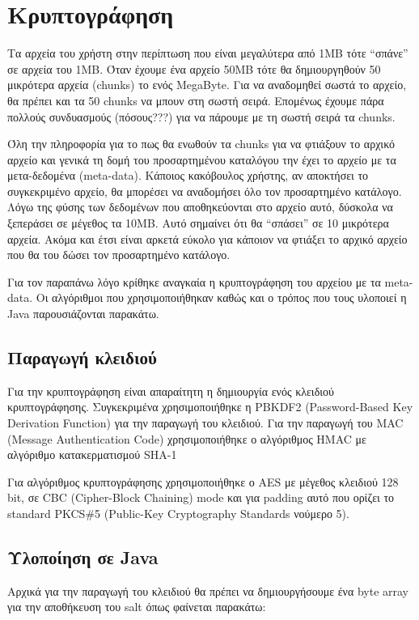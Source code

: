 \documentclass[a4paper]{article}
\begin{document}
\section{Κρυπτογράφηση}
Τα αρχεία του χρήστη στην περίπτωση που είναι μεγαλύτερα από 1MB τότε ``σπάνε''
σε αρχεία του 1MB. Όταν έχουμε ένα αρχείο 50MB τότε θα δημιουργηθούν 50
μικρότερα αρχεία (chunks) το ενός MegaByte. Για να αναδομηθεί σωστά το αρχείο,
θα πρέπει και τα 50 chunks να μπουν στη σωστή σειρά. Επομένως έχουμε πάρα
πολλούς συνδυασμούς (πόσους???) για να πάρουμε με τη σωστή σειρά τα chunks.

Όλη την πληροφορία για το πως θα ενωθούν τα chunks για να φτιάξουν το αρχικό
αρχείο και γενικά τη δομή του προσαρτημένου καταλόγου την έχει το αρχείο με τα
μετα-δεδομένα (meta-data). Κάποιος κακόβουλος χρήστης, αν αποκτήσει το
συγκεκριμένο αρχείο, θα μπορέσει να αναδομήσει όλο τον προσαρτημένο κατάλογο.
Λόγω της φύσης των δεδομένων που αποθηκεύονται στο αρχείο αυτό, δύσκολα να
ξεπεράσει σε μέγεθος τα 10MB. Αυτό σημαίνει ότι θα ``σπάσει'' σε 10 μικρότερα
αρχεία. Ακόμα και έτσι είναι αρκετά εύκολο για κάποιον να φτιάξει το αρχικό
αρχείο που θα του δώσει τον προσαρτημένο κατάλογο.

Για τον παραπάνω λόγο κρίθηκε αναγκαία η κρυπτογράφηση του αρχείου με τα
meta-data. Οι αλγόριθμοι που χρησιμοποιήθηκαν καθώς και ο τρόπος που τους
υλοποιεί η Java παρουσιάζονται παρακάτω.

\subsection{Παραγωγή κλειδιού}
Για την κρυπτογράφηση είναι απαραίτητη η δημιουργία ενός κλειδιού
κρυπτογράφησης. Συγκεκριμένα χρησιμοποιήθηκε η PBKDF2 (Password-Based Key
Derivation Function) για την παραγωγή του κλειδιού. Για την παραγωγή του MAC
(Message Authentication Code) χρησιμοποιήθηκε ο αλγόριθμος HMAC με αλγόριθμο
κατακερματισμού SHA-1

Για αλγόριθμος κρυπτογράφησης χρησιμοποιήθηκε ο AES με μέγεθος κλειδιού 128
bit, σε CBC (Cipher-Block Chaining) mode και για padding αυτό που ορίζει το
standard PKCS\#5 (Public-Key Cryptography Standards νούμερο 5).

\subsection{Υλοποίηση σε Java}
Αρχικά για την παραγωγή του κλειδιού θα πρέπει να δημιουργήσουμε ένα byte array
για την αποθήκευση του salt όπως φαίνεται παρακάτω:
\lstset{language=Java, numbers=left}

\end{document}
